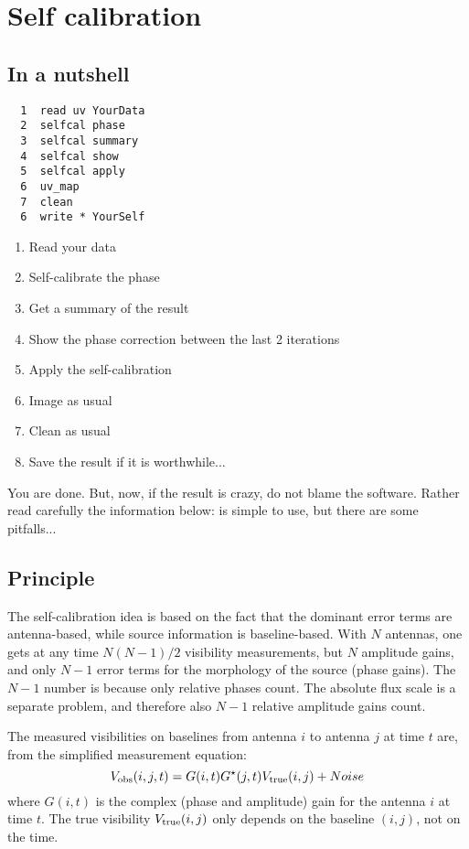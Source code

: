 \section{Self calibration}

\subsection{In a nutshell}

\begin{verbatim}
  1  read uv YourData
  2  selfcal phase
  3  selfcal summary
  4  selfcal show
  5  selfcal apply
  6  uv_map
  7  clean
  6  write * YourSelf 
\end{verbatim}
\begin{enumerate}\itemsep 0pt
\item Read your \uv{} data
\item Self-calibrate the phase
\item Get a summary of the result
\item Show the phase correction between the last 2 iterations
\item Apply the self-calibration
\item Image as usual
\item Clean as usual
\item Save the result if it is worthwhile...
\end{enumerate}
You are done. But, now, if the result is crazy, do not blame the
software. Rather read carefully the information below: 
is simple to use, but there are some pitfalls... 


\subsection{Principle}

The self-calibration idea is based on the fact that the dominant error terms
are antenna-based, while source information is baseline-based. 
With $N$ antennas, one gets at any time $N (N-1) /2$ visibility measurements, 
but $N$ amplitude gains, and only $N-1$ error terms for the morphology of the source (phase gains). 
The $N-1$ number is because only relative phases count. The absolute flux
scale is a separate problem, and therefore also $N-1$ relative amplitude gains count.

The measured visibilities 
on baselines from antenna $i$ to antenna $j$ at time $t$ are, 
from the simplified measurement equation:
\begin{equation}
    V_{\rm obs}(i,j,t) = G(i,t) G^{{\star}}(j,t)  V_{\rm true}(i,j) + Noise
\end{equation}    
where $G(i,t)$ is the complex (phase and amplitude) gain for the 
antenna $i$ at time $t$. The true visibility $V_{\rm true}(i,j)$ only 
depends on the baseline $(i,j)$, not on the time.
  
